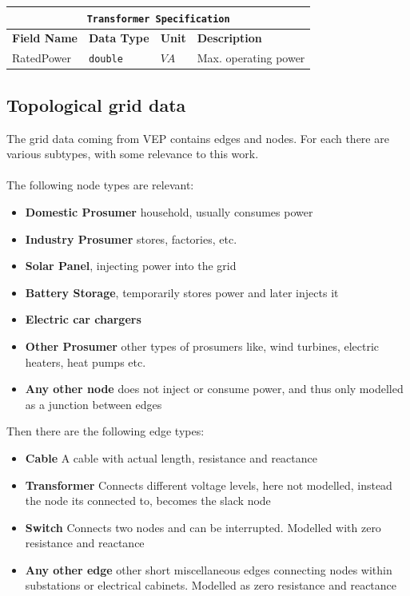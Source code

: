 \begin{tabular}{ l p{3cm} l p{8cm}} 
    \hline
    \multicolumn{4}{c}{\texttt{Transformer Specification}}\\
    \hline
    \textbf{Field Name} & \textbf{Data Type}        & \textbf{Unit} & \textbf{Description} \\
    \hline
    RatedPower          & \texttt{double}           & $VA$          & Max. operating power\\              
   \end{tabular}

\vspace{1cm}

\subsection{Topological grid data}

The grid data coming from VEP contains edges and nodes. For each there are various subtypes, with some relevance
to this work.\\
\\
The following node types are relevant:
\begin{itemize}
    \item \textbf{Domestic Prosumer} household, usually consumes power
    \item \textbf{Industry Prosumer} stores, factories, etc.
    \item \textbf{Solar Panel}, injecting power into the grid
    \item \textbf{Battery Storage}, temporarily stores power and later injects it
    \item \textbf{Electric car chargers}
    \item \textbf{Other Prosumer} other types of prosumers like, wind turbines, electric heaters, heat pumps etc. 
    \item \textbf{Any other node} does not inject or consume power, and thus only modelled as a junction between edges
\end{itemize}

Then there are the following edge types:

\begin{itemize}
    \item \textbf{Cable} A cable with actual length, resistance and reactance
    \item \textbf{Transformer} Connects different voltage levels, here not modelled, instead the node its connected to, becomes the slack node
    \item \textbf{Switch} Connects two nodes and can be interrupted. Modelled with zero resistance and reactance
    \item \textbf{Any other edge} other short miscellaneous edges connecting nodes within substations or electrical cabinets. Modelled as zero resistance and reactance
\end{itemize}

